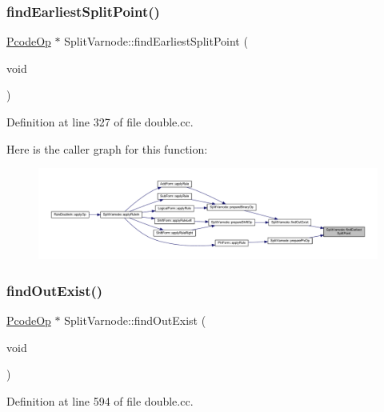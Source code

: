 \subsubsection{\texorpdfstring{findEarliestSplitPoint()}{findEarliestSplitPoint()}}
{\footnotesize\ttfamily \mbox{\hyperlink{class_pcode_op}{Pcode\+Op}} $\ast$ Split\+Varnode\+::find\+Earliest\+Split\+Point (\begin{DoxyParamCaption}\item[{void}]{ }\end{DoxyParamCaption})}



Definition at line 327 of file double.\+cc.

Here is the caller graph for this function\+:
\nopagebreak
\begin{figure}[H]
\begin{center}
\leavevmode
\includegraphics[width=350pt]{class_split_varnode_a2368506098ff81b475bc1e32d428a16c_icgraph}
\end{center}
\end{figure}
\mbox{\label{class_split_varnode_a19a8c2ae5257a563a5a0e7d3ccd7704e}} 
\subsubsection{\texorpdfstring{findOutExist()}{findOutExist()}}
{\footnotesize\ttfamily \mbox{\hyperlink{class_pcode_op}{Pcode\+Op}} $\ast$ Split\+Varnode\+::find\+Out\+Exist (\begin{DoxyParamCaption}\item[{void}]{ }\end{DoxyParamCaption})}



Definition at line 594 of file double.\+cc.

